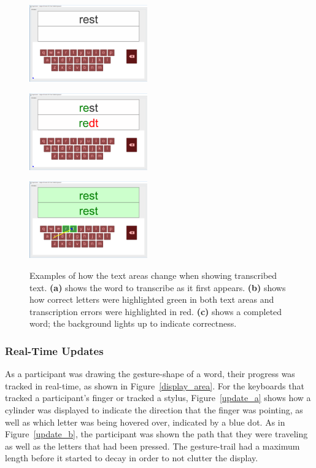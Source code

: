 \begin{figure}[b]
	\centering
	\begin{minipage}[t]{1.9in}
		\includegraphics[width=2in]{fig_idle_keyboard}
		\label{text_a}
	\end{minipage}
	\begin{minipage}[t]{1.9in}
		\includegraphics[width=2in]{fig_error_keyboard}
		\label{text_b}
	\end{minipage}
	\begin{minipage}[t]{1.9in}
		\includegraphics[width=2in]{fig_correct_keyboard}
		\label{text_c}
	\end{minipage}
	\caption[Display: Text Area]{Examples of how the text areas change when showing transcribed text. \textbf{(a)} shows the word to transcribe as it first appears. \textbf{(b)} shows how correct letters were highlighted green in both text areas and transcription errors were highlighted in red. \textbf{(c)} shows a completed word; the background lights up to indicate correctness.}
	\label{text_area}
\end{figure}

\subsubsection{Real-Time Updates}
As a participant was drawing the gesture-shape of a word, their progress was tracked in real-time, as shown in Figure~\ref{display_area}. For the keyboards that tracked a participant's finger or tracked a stylus, Figure~\ref{update_a} shows how a cylinder was displayed to indicate the direction that the finger was pointing, as well as which letter was being hovered over, indicated by a blue dot. As in Figure~\ref{update_b}, the participant was shown the path that they were traveling as well as the letters that had been pressed. The gesture-trail had a maximum length before it started to decay in order to not clutter the display. 

